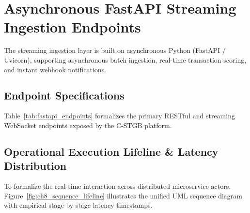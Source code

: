 \section{Asynchronous FastAPI Streaming Ingestion Endpoints}
The streaming ingestion layer is built on asynchronous Python (FastAPI / Uvicorn), supporting asynchronous batch ingestion, real-time transaction scoring, and instant webhook notifications.

\subsection{Endpoint Specifications}
Table~\ref{tab:fastapi_endpoints} formalizes the primary RESTful and streaming WebSocket endpoints exposed by the C-STGB platform.

\begin{table}[htbp]
\centering
\small
\caption[Enterprise RESTful and WebSocket API Endpoint Specifications]{Enterprise RESTful and WebSocket API Endpoint Specifications.}
\label{tab:fastapi_endpoints}
\end{table}

\subsection{Operational Execution Lifeline \& Latency Distribution}
To formalize the real-time interaction across distributed microservice actors, Figure~\ref{fig:ch8_sequence_lifeline} illustrates the unified UML sequence diagram with empirical stage-by-stage latency timestamps.


